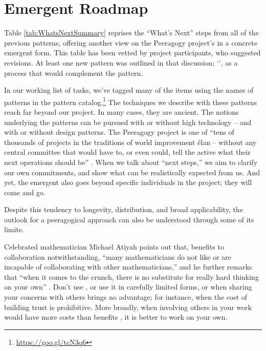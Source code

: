 \section{Emergent Roadmap} \label{sec:Distributed_Roadmap}

Table \ref{tab:WhatsNextSummary} reprises the ``What's Next'' steps
from all of the previous patterns, offering another view on the
Peeragogy project's  in a concrete emergent form.
%
This table has been vetted by project participants, who suggested
revisions.  At least one new pattern was outlined in that discussion;
`', as a process that would complement the
 pattern.

In our working list of tasks, we've tagged many of the items using the
names of patterns in the pattern
catalog.\footnote{\url{https://goo.gl/tcN3q6}} The techniques we
describe with these patterns reach far beyond our project.  In many
cases, they are ancient.  The notions underlying the patterns can be
pursued with or without high technology -- and with or without design
patterns.  The Peeragogy project is one of ``tens of thousands of
projects in the traditions of world improvement \'elan -- without any
central committee that would have to, or even could, tell the active
what their next operations should be''
\cite[p. 402]{sloterdijk2013change}.  When we talk about ``next
steps,'' we aim to clarify our own commitments, and show what can be
realistically expected from us.
And yet, the emergent  also goes beyond specific
individuals in the project; they will come and go.

Despite this tendency to longevity, distribution, and broad
applicability, the outlook for a peeragogical approach can also be
understood through some of its limits.

Celebrated mathematician Michael Atiyah points out that, benefits to
collaboration notwithstanding, ``many mathematicians do not like or
are incapable of collaborating with other mathematicians,'' and he
further remarks that ``when it comes to the crunch, there is no
substitute for really hard thinking on your own''
\cite{atiyah1974research}.  Don't use , or use
it in carefully limited forms, or when sharing your concerns with
others brings no advantage; for instance, when the cost of building
trust is prohibitive.  More broadly, when involving others in your
work would have more costs than benefits \cite{coase1937nature}, it is
better to work on your own.

